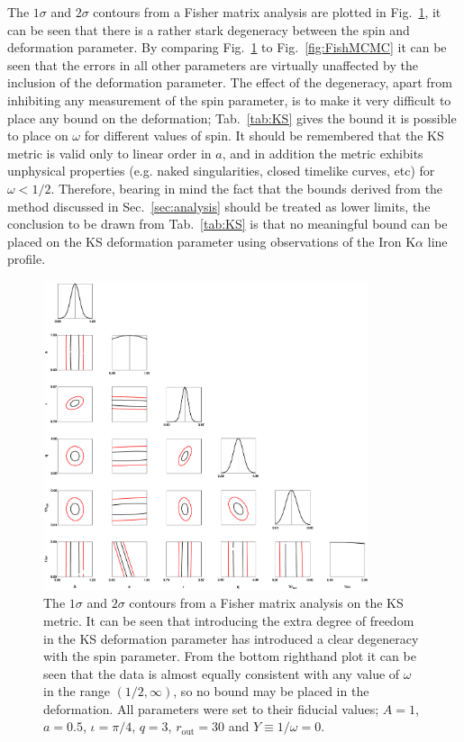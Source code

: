The $1\sigma$ and $2\sigma$ contours from a Fisher matrix analysis are plotted in Fig.\ \ref{fig:KSFish}, it can be seen that there is a rather stark degeneracy between the spin and deformation parameter. By comparing Fig.\ \ref{fig:KSFish} to Fig.\ \ref{fig:FishMCMC} it can be seen that the errors in all other parameters are virtually unaffected by the inclusion of the deformation parameter. The effect of the degeneracy, apart from inhibiting any measurement of the spin parameter, is to make it very difficult to place any bound on the deformation; Tab.\ \ref{tab:KS} gives the bound it is possible to place on $\omega$ for different values of spin. It should be remembered that the KS metric is valid only to linear order in $a$, and in addition the metric exhibits unphysical properties (e.g. naked singularities, closed timelike curves, etc) for $\omega < 1/2$. Therefore, bearing in mind the fact that the bounds derived from the method discussed in Sec.\ \ref{sec:analysis} should be treated as lower limits, the conclusion to be drawn from Tab.\ \ref{tab:KS} is that no meaningful bound can be placed on the KS deformation parameter using observations of the Iron K$\alpha$ line profile.

\begin{figure}[t]
 \centering
 \includegraphics[trim=0cm 0cm 0cm 0cm, width=0.85\textwidth]{KSFisherPlot.pdf}
 \caption{The $1\sigma$ and $2\sigma$ contours from a Fisher matrix analysis on the KS metric. It can be seen that introducing the extra degree of freedom in the KS deformation parameter has introduced a clear degeneracy with the spin parameter. From the bottom righthand plot it can be seen that the data is almost equally consistent with any value of $\omega$ in the range $(1/2,\infty)$, so no bound may be placed in the deformation. All parameters were set to their fiducial values; $A=1$, $a=0.5$, $\iota=\pi/4$, $q=3$, $r_{\textrm{out}}=30$ and $Y\equiv 1/\omega=0$.}
 \label{fig:KSFish}
\end{figure}


